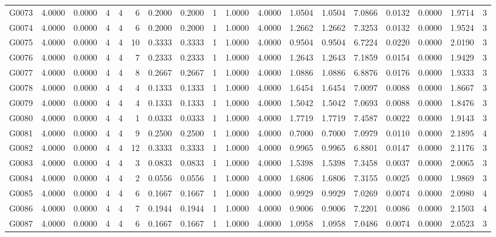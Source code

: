 \begin{tabular}{lrrrrrrrrrrrrrrrrr}
G0073 & 4.0000 & 0.0000 & 4 & 4 & 6 & 0.2000 & 0.2000 & 1 & 1.0000 & 4.0000 & 1.0504 & 1.0504 & 7.0866 & 0.0132 & 0.0000 & 1.9714 & 3 \\
G0074 & 4.0000 & 0.0000 & 4 & 4 & 6 & 0.2000 & 0.2000 & 1 & 1.0000 & 4.0000 & 1.2662 & 1.2662 & 7.3253 & 0.0132 & 0.0000 & 1.9524 & 3 \\
G0075 & 4.0000 & 0.0000 & 4 & 4 & 10 & 0.3333 & 0.3333 & 1 & 1.0000 & 4.0000 & 0.9504 & 0.9504 & 6.7224 & 0.0220 & 0.0000 & 2.0190 & 3 \\
G0076 & 4.0000 & 0.0000 & 4 & 4 & 7 & 0.2333 & 0.2333 & 1 & 1.0000 & 4.0000 & 1.2643 & 1.2643 & 7.1859 & 0.0154 & 0.0000 & 1.9429 & 3 \\
G0077 & 4.0000 & 0.0000 & 4 & 4 & 8 & 0.2667 & 0.2667 & 1 & 1.0000 & 4.0000 & 1.0886 & 1.0886 & 6.8876 & 0.0176 & 0.0000 & 1.9333 & 3 \\
G0078 & 4.0000 & 0.0000 & 4 & 4 & 4 & 0.1333 & 0.1333 & 1 & 1.0000 & 4.0000 & 1.6454 & 1.6454 & 7.0097 & 0.0088 & 0.0000 & 1.8667 & 3 \\
G0079 & 4.0000 & 0.0000 & 4 & 4 & 4 & 0.1333 & 0.1333 & 1 & 1.0000 & 4.0000 & 1.5042 & 1.5042 & 7.0693 & 0.0088 & 0.0000 & 1.8476 & 3 \\
G0080 & 4.0000 & 0.0000 & 4 & 4 & 1 & 0.0333 & 0.0333 & 1 & 1.0000 & 4.0000 & 1.7719 & 1.7719 & 7.4587 & 0.0022 & 0.0000 & 1.9143 & 3 \\
G0081 & 4.0000 & 0.0000 & 4 & 4 & 9 & 0.2500 & 0.2500 & 1 & 1.0000 & 4.0000 & 0.7000 & 0.7000 & 7.0979 & 0.0110 & 0.0000 & 2.1895 & 4 \\
G0082 & 4.0000 & 0.0000 & 4 & 4 & 12 & 0.3333 & 0.3333 & 1 & 1.0000 & 4.0000 & 0.9965 & 0.9965 & 6.8801 & 0.0147 & 0.0000 & 2.1176 & 3 \\
G0083 & 4.0000 & 0.0000 & 4 & 4 & 3 & 0.0833 & 0.0833 & 1 & 1.0000 & 4.0000 & 1.5398 & 1.5398 & 7.3458 & 0.0037 & 0.0000 & 2.0065 & 3 \\
G0084 & 4.0000 & 0.0000 & 4 & 4 & 2 & 0.0556 & 0.0556 & 1 & 1.0000 & 4.0000 & 1.6806 & 1.6806 & 7.3155 & 0.0025 & 0.0000 & 1.9869 & 3 \\
G0085 & 4.0000 & 0.0000 & 4 & 4 & 6 & 0.1667 & 0.1667 & 1 & 1.0000 & 4.0000 & 0.9929 & 0.9929 & 7.0269 & 0.0074 & 0.0000 & 2.0980 & 4 \\
G0086 & 4.0000 & 0.0000 & 4 & 4 & 7 & 0.1944 & 0.1944 & 1 & 1.0000 & 4.0000 & 0.9006 & 0.9006 & 7.2201 & 0.0086 & 0.0000 & 2.1503 & 4 \\
G0087 & 4.0000 & 0.0000 & 4 & 4 & 6 & 0.1667 & 0.1667 & 1 & 1.0000 & 4.0000 & 1.0958 & 1.0958 & 7.0486 & 0.0074 & 0.0000 & 2.0523 & 3 \\

\end{tabular}
